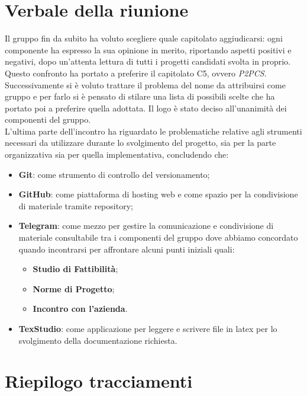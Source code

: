 \section{Verbale della riunione}
Il gruppo fin da subito ha voluto scegliere quale capitolato aggiudicarsi:
ogni componente ha espresso la sua opinione in merito, riportando aspetti positivi e negativi,
dopo un'attenta lettura di tutti i progetti candidati svolta in proprio.
Questo confronto ha portato a preferire il capitolato C5, ovvero \textit{P2PCS}.\\
Successivamente si è voluto trattare il problema del nome da attribuirsi come gruppo e
per farlo si è pensato di stilare una lista di possibili scelte che ha portato poi a
preferire quella adottata. Il logo è stato deciso all'unanimità dei componenti del gruppo.\\
L'ultima parte dell'incontro ha riguardato le problematiche relative agli strumenti necessari da utilizzare
durante lo svolgimento del progetto, sia per la parte organizzativa sia per quella implementativa,
concludendo che:
\begin{itemize}
\item \textbf{Git}: come strumento di controllo del versionamento;
\item \textbf{GitHub}: come piattaforma di hosting web e come spazio per la condivisione di materiale tramite repository;
\item \textbf{Telegram}: come mezzo per gestire la comunicazione e condivisione di materiale consultabile tra i componenti
del gruppo dove abbiamo concordato quando incontrarsi per affrontare alcuni punti iniziali quali:
	\begin{itemize}
		\item \textbf{Studio di Fattibilità};
		\item \textbf{Norme di Progetto};
		\item \textbf{Incontro con l'azienda}.
	\end{itemize}
\item \textbf{TexStudio}: come applicazione per leggere e scrivere file in latex per lo svolgimento della documentazione richiesta.
\end{itemize} 
\pagebreak
\section{Riepilogo tracciamenti}

	

